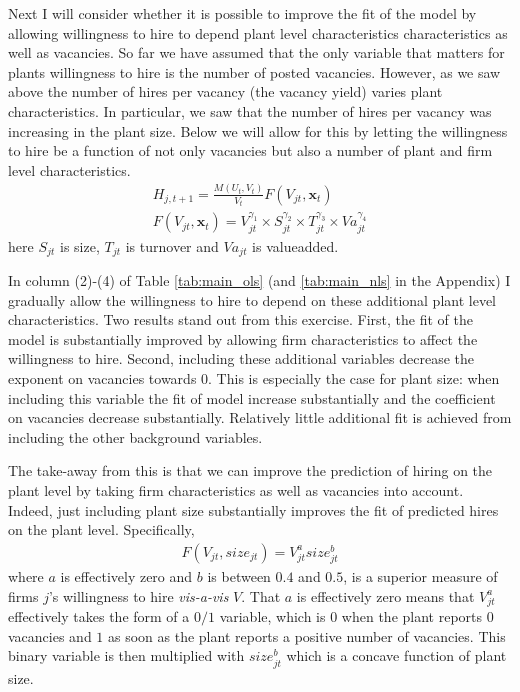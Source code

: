 

Next I will consider whether it is possible to improve the fit of the model by allowing willingness to hire to depend plant level characteristics characteristics as well as vacancies. So far we have assumed that the only variable that matters for plants willingness to hire is the number of posted vacancies. However, as we saw above the number of hires per vacancy (the vacancy yield) varies plant characteristics. In particular, we saw that the number of hires per vacancy was increasing in the plant size. Below we will allow for this by letting the willingness to hire be a function of not only vacancies but also a number of plant and firm level characteristics.
\begin{align}
H_{j,t+1}=\frac{M(U_t, V_t)}{V_t} F\left( V_{jt}, \mathbf{x}_t \right) \\
F(V_{jt},\mathbf{x}_t)=V_{jt}^{\gamma_1}  \times  S_{jt}^{\gamma_2} \times T_{jt}^{\gamma_3} \times  Va_{jt}^{\gamma_4}
\end{align}
here $S_{jt}$ is size, $T_{jt}$ is turnover and $Va_{jt}$ is valueadded. %

In column (2)-(4) of Table \ref{tab:main_ols} (and \ref{tab:main_nls} in the Appendix) I gradually allow the willingness to hire to depend on these additional plant level characteristics. Two results stand out from this exercise. First, the fit of the model is substantially improved by allowing firm characteristics to affect the willingness to hire. Second, including these additional variables decrease the exponent on vacancies towards $0$. This is especially the case for plant size: when including this variable the fit of model increase substantially and the coefficient on vacancies decrease substantially. Relatively little additional fit is achieved from including the other background variables.  

The take-away from this is that we can improve the prediction of hiring on the plant level by taking firm characteristics as well as vacancies into account. Indeed, just including plant size substantially improves the fit of predicted hires on the plant level. Specifically,
\begin{align}
F(V_{jt}, size_{jt})=V_{jt}^{a} size_{jt}^{b}
\end{align}
where $a$ is effectively zero and $b$ is between $0.4$ and $0.5$, is a superior measure of firms $j$'s willingness to hire \emph{vis-a-vis} $V$. That $a$ is effectively zero means that $V_{jt}^{a}$ effectively takes the form of a $0/1$ variable, which is $0$ when the plant reports $0$ vacancies and $1$ as soon as the plant reports a positive number of vacancies. This binary variable is then multiplied with $size_{jt}^{b}$ which is a concave function of plant size.

